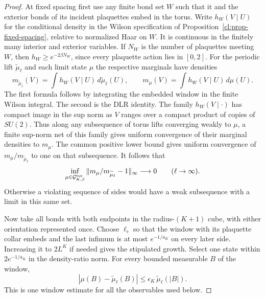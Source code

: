\documentclass[11pt,letterpaper,reqno]{amsart}
\numberwithin{equation}{section}
\theoremstyle{definition}
\theoremstyle{remark}
\begin{document}
\begin{proof}
At fixed spacing first use any finite bond set \(W\) such that
it and the exterior bonds of its incident plaquettes embed in
the torus. Write \(h_W(V\mid U)\) for the conditional density
in the Wilson specification of
Proposition~\ref{cl:prop-fixed-spacing}, relative to normalized
Haar on \(W\). It is continuous in the finitely many interior
and exterior variables. If \(N_W\) is the number of plaquettes
meeting \(W\), then \(h_W\ge e^{-2\beta N_W}\), since every
plaquette action lies in \([0,2]\).
For the periodic lift \(\widetilde\mu_\ell\) and each limit
state \(\mu\) the respective marginals have densities
\[
 m_{\widetilde\mu_\ell}(V)=\int h_W(V\mid U)\,d\widetilde\mu_\ell(U),
 \qquad
 m_\mu(V)=\int h_W(V\mid U)\,d\mu(U).
\]
The first formula follows by integrating the embedded window
in the finite Wilson integral. The second is the DLR identity.
The family \(h_W(V\mid\cdot)\) has compact image in the sup norm
as \(V\) ranges over a compact product of copies of \(SU(2)\).
Thus along any subsequence of torus lifts converging weakly to
\(\mu\), a finite sup-norm net of this family gives uniform
convergence of their marginal densities to \(m_\mu\).
The common positive lower bound gives uniform convergence
of \(m_\mu/m_{\widetilde\mu_\ell}\) to one on that subsequence.
It follows that
\[
 \inf_{\mu\in\mathcal G^{\rm tor}_{K,\beta}}
 \|m_\mu/m_{\widetilde\mu_\ell}-1\|_\infty\longrightarrow0
 \qquad(\ell\to\infty).
\]
Otherwise a violating sequence of sides would have a weak
subsequence with a limit in this same set.

Now take all bonds with both endpoints in the radius-\((K+1)\)
cube, with either orientation represented once.
Choose \(\ell_\flat\) so that the window with its plaquette
collar embeds and the last infimum is at most \(e^{-1/a_K}\)
on every later side. Increasing it to \(2L^K\) if needed gives
the stipulated growth. Select one state within \(2e^{-1/a_K}\)
in the density-ratio norm. For every bounded measurable \(B\)
of the window,
\begin{equation}\label{cl:eq-recognition-density}
 |\mu(B)-\widetilde\mu_\ell(B)|
 \le\epsilon_K\,\widetilde\mu_\ell(|B|).
\end{equation}
This is one window estimate for all the observables used below.


\end{proof}
\end{document}
